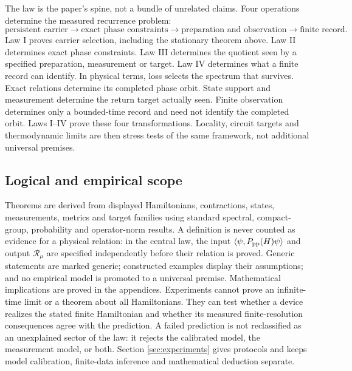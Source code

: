The law is the paper's spine, not a bundle of unrelated claims.  Four
operations determine the measured recurrence problem:
\begin{equation}
 \boxed{
 \text{persistent carrier}
 \longrightarrow \text{exact phase constraints}
 \longrightarrow \text{preparation and observation}
 \longrightarrow \text{finite record}.}
 \label{eq:fourquestions-new}
\end{equation}
Law I proves carrier selection, including the stationary theorem above.  Law
II determines exact phase constraints.  Law III determines the quotient seen
by a specified preparation, measurement or target.  Law IV determines what a
finite record can identify.  In physical terms, loss selects the spectrum
that survives.  Exact relations determine its
completed phase orbit.  State support and measurement determine the return
target actually seen.  Finite observation determines only a bounded-time
record and need not identify the completed orbit.  Laws I--IV prove these four
transformations.  Locality, circuit targets and thermodynamic limits are then
stress tests of the same framework, not additional universal premises.

\subsection{Logical and empirical scope}

Theorems are derived from displayed Hamiltonians, contractions, states,
measurements, metrics and target families using standard spectral, compact-
group, probability and operator-norm results.  A definition is never counted
as evidence for a physical relation: in the central law, the input
$\langle\psi,P_{\rm pp}(H)\psi\rangle$ and output
$\mathscr R_\mu$ are specified independently before their relation is proved.
Generic statements are marked generic; constructed examples display their
assumptions; and no empirical model is promoted to a universal premise.
Mathematical implications are proved in the appendices.  Experiments cannot
prove an infinite-time limit or a theorem about all Hamiltonians.  They can
test whether a device realizes the stated finite Hamiltonian and whether its
measured finite-resolution consequences agree with the prediction.  A failed
prediction is not reclassified as an unexplained sector of the law: it rejects
the calibrated model, the measurement model, or both.  Section
\ref{sec:experiments} gives protocols and keeps model calibration, finite-data
inference and mathematical deduction separate.

